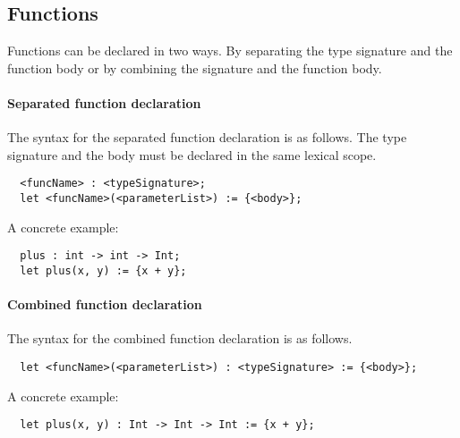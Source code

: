 \subsection{Functions}
\label{sec:functions}

Functions can be declared in two ways. By separating the type signature and the function body or by combining the signature and the function body.

\paragraph{Separated function declaration}

The syntax for the separated function declaration is as follows. The type signature and the body must be declared in the same lexical scope.

\begin{verbatim}
  <funcName> : <typeSignature>;
  let <funcName>(<parameterList>) := {<body>};
\end{verbatim}

A concrete example:

\begin{verbatim}
  plus : int -> int -> Int;
  let plus(x, y) := {x + y};
\end{verbatim}


\paragraph{Combined function declaration}

The syntax for the combined function declaration is as follows.

\begin{verbatim}
  let <funcName>(<parameterList>) : <typeSignature> := {<body>};
\end{verbatim}

A concrete example:

\begin{verbatim}
  let plus(x, y) : Int -> Int -> Int := {x + y};
\end{verbatim}
